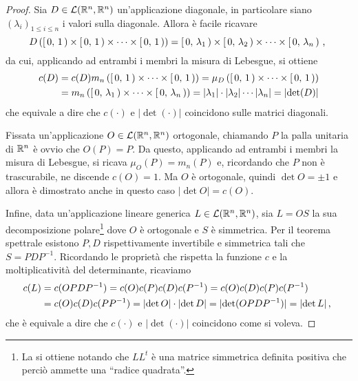 \begin{proof}
	Sia $D\in\mathcal L(\mathbb R^n,\mathbb R^n)$ un'applicazione diagonale, in particolare siano $(\lambda_i)_{1\le i\le n}$ i valori sulla diagonale.
	Allora è facile ricavare
	\begin{equation*}
		D\left(\left[\,0,\,1\,\right)\times\left[\,0,\,1\,\right)\times\dots\times\left[\,0,\,1\,\right)\right)=\left[\,0,\,\lambda_1\,\right)\times\left[\,0,\,\lambda_2\,\right)\times\cdots\times\left[\,0,\,\lambda_n\,\right)\, \text{, }
	\end{equation*}
	da cui, applicando ad entrambi i membri la misura di Lebesgue, si ottiene
	\begin{align*}
		c(D)&=c(D)m_n\left(\left[\,0,\,1\,\right)\times\dots\times\left[\,0,\,1\,\right)\right)=\mu_D\left(\left[\,0,\,1\,\right)\times\dots\times\left[\,0,\,1\,\right)\right)\\
		&=m_n\left(\left[\,0,\,\lambda_1\,\right)\times\cdots\times\left[\,0,\,\lambda_n\,\right)\right)=
		\lvert\lambda_1\rvert\cdot\lvert\lambda_2\rvert\cdots\lvert\lambda_n\rvert=\lvert\det(D)\rvert
	\end{align*}
	che equivale a dire che $c(\cdot)$ e $\lvert\det(\cdot)\rvert$ coincidono sulle matrici diagonali.
	
	Fissata un'applicazione $O\in\mathcal L(\mathbb R^n,\mathbb R^n)$ ortogonale, chiamando $P$ la palla unitaria di $\mathbb R^n$ è ovvio che $O(P)=P$.
	Da questo, applicando ad entrambi i membri la misura di Lebesgue, si ricava $\mu_O(P)=m_n(P)$ e, ricordando che $P$ non è trascurabile, ne discende $c(O)=1$.
	Ma $O$ è ortogonale, quindi $\det O=\pm 1$ e allora è dimostrato anche in questo caso $\lvert\det O\rvert =c(O)$.
	
	Infine, data un'applicazione lineare generica $L\in\mathcal L(\mathbb R^n,\mathbb R^n)$, sia $L=OS$ la sua decomposizione polare\footnote{La si ottiene notando che $LL^t$ è una matrice simmetrica definita positiva che perciò ammette una ``radice quadrata''.} dove $O$ è ortogonale e $S$ è simmetrica. Per il teorema spettrale esistono $P,D$ rispettivamente invertibile e simmetrica tali che $S=PDP^{-1}$.
	Ricordando le proprietà che rispetta la funzione $c$ e la moltiplicatività del determinante, ricaviamo
	\begin{align*}
		c(L)&=c(OPDP^{-1})=c(O)c(P)c(D)c(P^{-1})=c(O)c(D)c(P)c(P^{-1})\\
		&=c(O)c(D)c(PP^{-1})=\lvert\det O\rvert\cdot\lvert\det D\rvert=\lvert \det(OPDP^{-1})\rvert=\lvert\det L\rvert \, \text{, }
	\end{align*}
	che è equivale a dire che $c(\cdot)$ e $\lvert\det(\cdot)\rvert$ coincidono come si voleva.
\end{proof}

